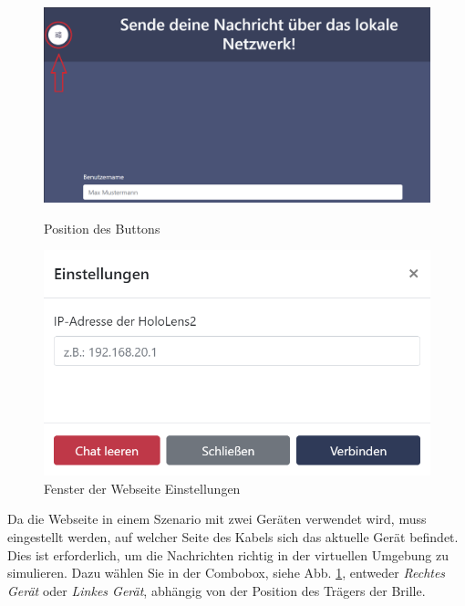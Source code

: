 \begin{itemize}
\begin{figure}[H]
    \centering
    \begin{minipage}[b]{0.7\textwidth}
        \centering
        \includegraphics[width=\textwidth]{images/WebButton}
        \caption{Position des Buttons}
        \label{fig:webbut}
    \end{minipage}
    \hfill
    \begin{minipage}[b]{0.4\textwidth}
        \centering
        \includegraphics[width=\textwidth]{images/WebseiteSettings}
        \caption{Fenster der Webseite Einstellungen}
        \label{fig:websettings}
    \end{minipage}
\end{figure}

Da die Webseite in einem Szenario mit zwei Geräten verwendet wird, muss eingestellt werden, auf welcher Seite des Kabels
sich das aktuelle Gerät befindet. Dies ist erforderlich, um die Nachrichten richtig in der virtuellen Umgebung zu simulieren. Dazu wählen Sie in der Combobox, siehe Abb. \ref{fig:websettings}, entweder \textit{Rechtes Gerät} oder \textit{Linkes Gerät}, abhängig von der Position des Trägers der Brille.


\end{itemize}
